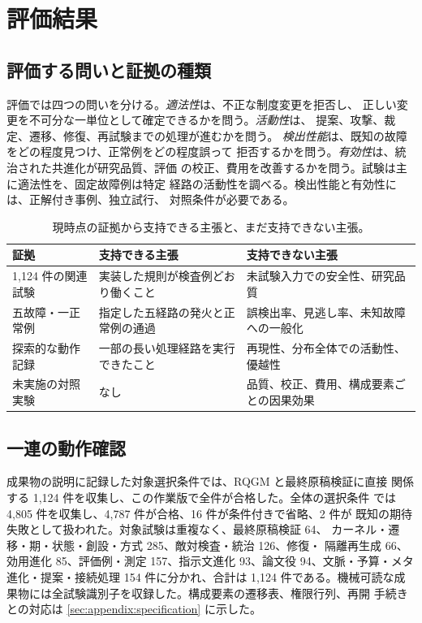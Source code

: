 \section{評価結果}\label{chapter:eval}

\subsection{評価する問いと証拠の種類}\label{sec:eval:sample}

評価では四つの問いを分ける。\emph{適法性}は、不正な制度変更を拒否し、
正しい変更を不可分な一単位として確定できるかを問う。\emph{活動性}は、
提案、攻撃、裁定、遷移、修復、再試験までの処理が進むかを問う。
\emph{検出性能}は、既知の故障をどの程度見つけ、正常例をどの程度誤って
拒否するかを問う。\emph{有効性}は、統治された共進化が研究品質、評価
の校正、費用を改善するかを問う。試験は主に適法性を、固定故障例は特定
経路の活動性を調べる。検出性能と有効性には、正解付き事例、独立試行、
対照条件が必要である。

\begin{table}[t]
  \centering
  \small
  \begin{tabularx}{\columnwidth}{@{}lXX@{}}
    \toprule
    \textbf{証拠} & \textbf{支持できる主張} & \textbf{支持できない主張} \\
    \midrule
    1,124 件の関連試験 & 実装した規則が検査例どおり働くこと &
      未試験入力での安全性、研究品質 \\
    五故障・一正常例 & 指定した五経路の発火と正常例の通過 &
      誤検出率、見逃し率、未知故障への一般化 \\
    探索的な動作記録 & 一部の長い処理経路を実行できたこと &
      再現性、分布全体での活動性、優越性 \\
    未実施の対照実験 & なし &
      品質、校正、費用、構成要素ごとの因果効果 \\
    \bottomrule
  \end{tabularx}
  \caption{現時点の証拠から支持できる主張と、まだ支持できない主張。}
  \label{tab:eval-status}
\end{table}

\subsection{一連の動作確認}\label{sec:eval:construction}

成果物の説明に記録した対象選択条件では、RQGM と最終原稿検証に直接
関係する 1,124 件を収集し、この作業版で全件が合格した。全体の選択条件
では 4,805 件を収集し、4,787 件が合格、16 件が条件付きで省略、2 件が
既知の期待失敗として扱われた。対象試験は重複なく、最終原稿検証 64、
カーネル・遷移・期・状態・創設・方式 285、敵対検査・統治 126、修復・
隔離再生成 66、効用進化 85、評価例・測定 157、指示文進化 93、論文役
94、文脈・予算・メタ進化・提案・接続処理 154 件に分かれ、合計は
1,124 件である。機械可読な成果物には全試験識別子を収録した。構成要素の遷移表、権限行列、再開
手続きとの対応は \cref{sec:appendix:specification} に示した。

